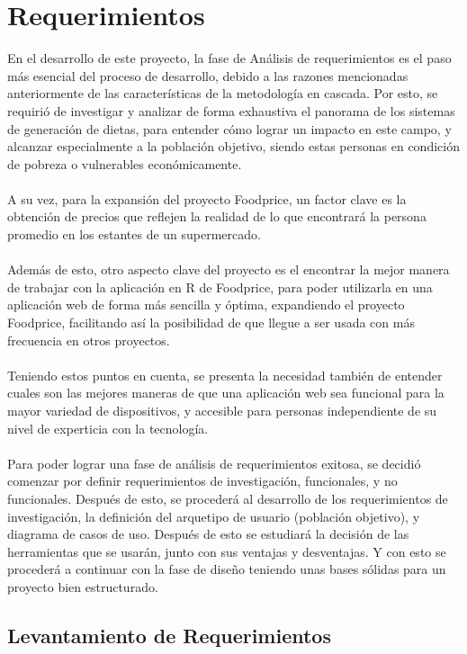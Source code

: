 \section{Requerimientos}
\noindent En el desarrollo de este proyecto, la fase de An\'alisis de requerimientos es el paso m\'as esencial del proceso de desarrollo, debido a las razones mencionadas anteriormente de las caracter\'isticas de la metodolog\'ia en cascada. Por esto, se requiri\'o de investigar y analizar de forma exhaustiva el panorama de los sistemas de generaci\'on de dietas, para entender c\'omo lograr un impacto en este campo, y alcanzar especialmente a la poblaci\'on objetivo, siendo estas personas en condici\'on de pobreza o vulnerables econ\'omicamente. 
\\
\\
A su vez, para la expansi\'on del proyecto Foodprice, un factor clave es la obtenci\'on de precios que reflejen la realidad de lo que encontrar\'a la persona promedio en los estantes de un supermercado.
\\
\\
Adem\'as de esto, otro aspecto clave del proyecto es el encontrar la mejor manera de trabajar con la aplicaci\'on en R de Foodprice, para poder utilizarla en una aplicaci\'on web de forma m\'as sencilla y \'optima, expandiendo el proyecto Foodprice, facilitando as\'i la posibilidad de que llegue a ser usada con m\'as frecuencia en otros proyectos.
\\
\\
Teniendo estos puntos en cuenta, se presenta la necesidad tambi\'en de entender cuales son las mejores maneras de que una aplicaci\'on web sea funcional para la mayor variedad de dispositivos,  y accesible para personas independiente de su nivel de experticia con la tecnolog\'ia.
\\
\\
Para poder lograr una fase de an\'alisis de requerimientos exitosa, se decidi\'o comenzar por definir requerimientos de investigaci\'on, funcionales, y no funcionales. Despu\'es de esto, se proceder\'a al desarrollo de los requerimientos de investigaci\'on, la definici\'on del arquetipo de usuario (poblaci\'on objetivo), y diagrama de casos de uso. Despu\'es de esto se estudiar\'a la decisi\'on de las herramientas que se usar\'an, junto con sus ventajas y desventajas. Y con esto se proceder\'a a continuar con la fase de dise\~{n}o teniendo unas bases s\'olidas para un proyecto bien estructurado.


\subsection{Levantamiento de Requerimientos}

